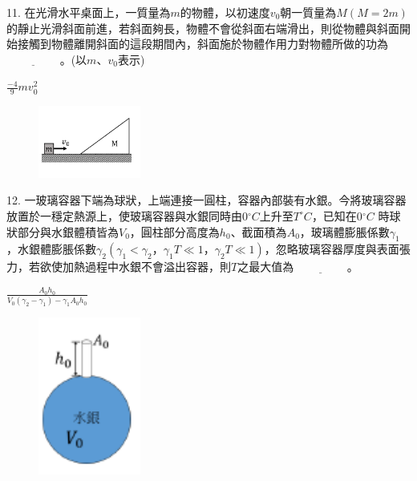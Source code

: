 \documentclass[cn,10pt,math=newtx,chinesefont=founder,device=ig]{elegantbook}
\begin{document}
\begin{example}
   11. 在光滑水平桌面上，一質量為$m$的物體，以初速度$v_0$朝一質量為$M(M=2m)$的靜止光滑斜面前進，若斜面夠長，物體不會從斜面右端滑出，則從物體與斜面開始接觸到物體離開斜面的這段期間內，斜面施於物體作用力對物體所做的功為$\underline{\hspace{2cm}}$。(以$m、v_0$表示)\\
    \rightline{[桃園高中教甄109]}
\end{example}
\begin{solution}
    $\frac{-4}{9} m v^2_0$
\end{solution}
\begin{figure}[htbp]
    \flushright
    \includegraphics[width=0.3\textwidth]{image/109桃園11.png}
  \end{figure}
\newpage


\begin{example}
   12. 一玻璃容器下端為球狀，上端連接一圓柱，容器內部裝有水銀。今將玻璃容器放置於一穩定熱源上，使玻璃容器與水銀同時由0$^\circ C$上升至$T^\circ C$，已知在0$^\circ C$ 時球狀部分與水銀體積皆為$V_0$，圓柱部分高度為$ℎ_0$、截面積為$A_0$，玻璃體膨脹係數$\gamma_1$，水銀體膨脹係數$\gamma_2(\gamma_1<\gamma_2 ， \gamma_1 T\ll1 ， \gamma_2 T\ll 1)$，忽略玻璃容器厚度與表面張力，若欲使加熱過程中水銀不會溢出容器，則$T$之最大值為$\underline{\hspace{2cm}}$。\\
    \rightline{[桃園高中教甄109]}
\end{example}
\begin{solution}
    $\frac{A_0 h_0} {V_0 (\gamma_2 -\gamma_1) - \gamma_1 A_0 h_0}$
\end{solution}
\begin{figure}[htbp]
    \flushright
    \includegraphics[width=0.3\textwidth]{image/109桃園12.png}
  \end{figure}
\newpage
\end{document}
